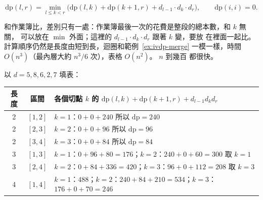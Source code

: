 \begin{center}
\end{center}

\[
\mathrm{dp}(l, r) = \min_{l \le k < r} \bigl(\mathrm{dp}(l, k) + \mathrm{dp}(k + 1, r) + d_{l-1} \cdot d_k \cdot d_r\bigr),
\qquad \mathrm{dp}(i, i) = 0.
\]

\begin{center}
\label{fig:ivdp-matrix}
\end{center}

和作業簿比，差別只有一處：作業簿最後一次的花費是整段的總本數，和 $k$ 無關，
可以放在 $\min$ 外面；這裡的 $d_{l-1} \cdot d_k \cdot d_r$ 跟著 $k$ 變，要放
在裡面一起比。 計算順序仍然是長度由短到長，迴圈和範例~\ref{ex:ivdp-merge}
一模一樣，時間 $O(n^3)$（最內層大約 $n^3/6$ 次），表格 $O(n^2)$。 $n$ 到幾百
都很快。

以 $d = 5, 8, 6, 2, 7$ 填表：

\begin{center}
\begin{tabular}{ccl}
\toprule
長度 & 區間 & 各個切點 $k$ 的 $\mathrm{dp}(l, k) + \mathrm{dp}(k + 1, r) + d_{l-1} d_k d_r$ \\
\midrule
2 & $[1, 2]$ & $k = 1$：$0 + 0 + 240$ \quad 所以 $\mathrm{dp} = 240$ \\
2 & $[2, 3]$ & $k = 2$：$0 + 0 + 96$ \quad 所以 $\mathrm{dp} = 96$ \\
2 & $[3, 4]$ & $k = 3$：$0 + 0 + 84$ \quad 所以 $\mathrm{dp} = 84$ \\
3 & $[1, 3]$ & $k = 1$：$0 + 96 + 80 = 176$；$k = 2$：$240 + 0 + 60 = 300$ \quad 取 $k = 1$ \\
3 & $[2, 4]$ & $k = 2$：$0 + 84 + 336 = 420$；$k = 3$：$96 + 0 + 112 = 208$ \quad 取 $k = 3$ \\
4 & $[1, 4]$ & $k = 1$：$488$；$k = 2$：$240 + 84 + 210 = 534$；$k = 3$：$176 + 0 + 70 = 246$ \\
\bottomrule
\end{tabular}
\end{center}

